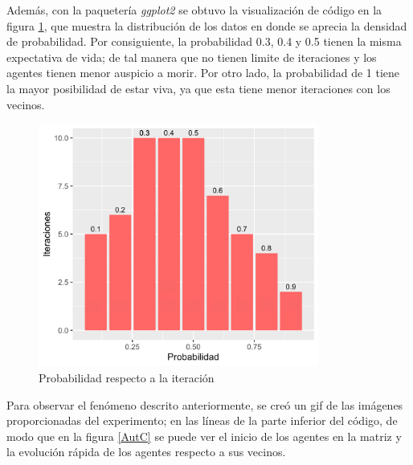 \documentclass[12pt, letterpaper] {article}
\begin{document}
Además, con la paquetería \textit{ggplot2} se obtuvo la visualización de código en la figura \ref{ProbI}, que muestra la distribución de los datos en donde se aprecia la densidad de probabilidad. Por consiguiente, la probabilidad 0.3, 0.4 y 0.5 tienen la misma expectativa de vida; de tal manera que no tienen limite de iteraciones y los agentes tienen menor auspicio a morir. Por otro lado, la probabilidad de 1 tiene la mayor posibilidad de estar viva, ya que esta tiene menor iteraciones con los vecinos.

\begin{figure}[H]
\centering\includegraphics[width=92mm]{Probainter.png}
\caption{Probabilidad respecto a la iteración}
\label{ProbI}
\end{figure}

Para observar el fenómeno descrito anteriormente, se creó un gif de las imágenes proporcionadas del experimento; en las líneas de la parte inferior del código, de modo que en la figura \ref{AutC} se puede ver el inicio de los agentes en la matriz y la evolución rápida de los agentes respecto a sus vecinos. 
\end{document}
